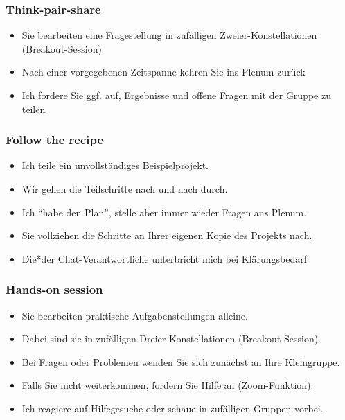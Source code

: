 \documentclass[11pt,german,a4paper]{article}
\providecommand{\tightlist}{%
  \setlength{\itemsep}{0pt}\setlength{\parskip}{0pt}}
\begin{document}
\hypertarget{think-pair-share}{%
\subsubsection{Think-pair-share}\label{think-pair-share}}

\begin{itemize}
\tightlist
\item
  Sie bearbeiten eine Fragestellung in zufälligen Zweier-Konstellationen (Breakout-Session)
\item
  Nach einer vorgegebenen Zeitspanne kehren Sie ins Plenum zurück
\item
  Ich fordere Sie ggf. auf, Ergebnisse und offene Fragen mit der Gruppe zu teilen
\end{itemize}

\hypertarget{follow-the-recipe}{%
\subsubsection{Follow the recipe}\label{follow-the-recipe}}

\begin{itemize}
\tightlist
\item
  Ich teile ein unvollständiges Beispielprojekt.
\item
  Wir gehen die Teilschritte nach und nach durch.
\item
  Ich ``habe den Plan'', stelle aber immer wieder Fragen ans Plenum.
\item
  Sie vollziehen die Schritte an Ihrer eigenen Kopie des Projekts nach.
\item
  Die*der Chat-Verantwortliche unterbricht mich bei Klärungsbedarf
\end{itemize}

\hypertarget{hands-on-session}{%
\subsubsection{Hands-on session}\label{hands-on-session}}

\begin{itemize}
\tightlist
\item
  Sie bearbeiten praktische Aufgabenstellungen alleine.
\item
  Dabei sind sie in zufälligen Dreier-Konstellationen (Breakout-Session).
\item
  Bei Fragen oder Problemen wenden Sie sich zunächst an Ihre Kleingruppe.
\item
  Falls Sie nicht weiterkommen, fordern Sie Hilfe an (Zoom-Funktion).
\item
  Ich reagiere auf Hilfegesuche oder schaue in zufälligen Gruppen vorbei.
\end{itemize}
\end{document}
